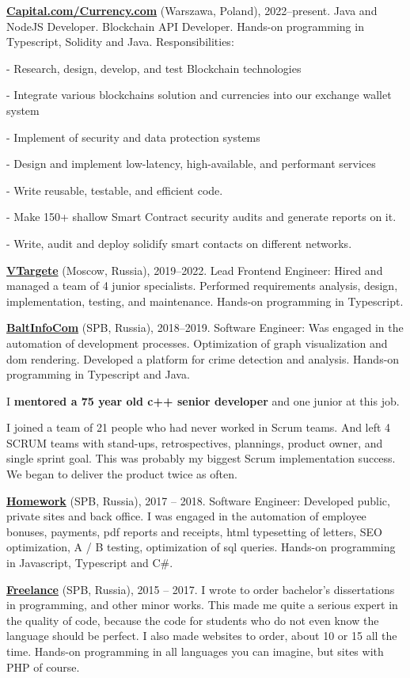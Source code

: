 \documentclass{yb}
\begin{document}
\href{https://currency.com/}{\textbf{Capital.com/Currency.com}} (Warszawa, Poland), 2022--present.
Java and NodeJS Developer. Blockchain API Developer.
Hands-on programming in Typescript, Solidity and Java.
Responsibilities:

- Research, design, develop, and test Blockchain technologies

- Integrate various blockchains solution and currencies into our exchange wallet system

- Implement of security and data protection systems

- Design and implement low-latency, high-available, and performant services

- Write reusable, testable, and efficient code.

- Make 150+ shallow Smart Contract security audits and generate reports on it.

- Write, audit and deploy solidify smart contacts on different networks.


\href{https://vtargete.ru/}{\textbf{VTargete}} (Moscow, Russia), 2019--2022.
Lead Frontend Engineer: 
Hired and managed a team of 4 junior specialists.
Performed requirements analysis, design, implementation, testing, and maintenance.
Hands-on programming in Typescript.

\textbf{\href{https://baltinfocom.ru/BigData\#en}{BaltInfoCom}} (SPB, Russia), 2018--2019.
Software Engineer:
Was engaged in the automation of development processes. Optimization of graph visualization and dom rendering. Developed a platform for crime detection and analysis.
Hands-on programming in Typescript and Java.

I \textbf{mentored a 75 year old c++ senior developer} and one junior at this job.

I joined a team of 21 people who had never worked in Scrum teams. And left 4 SCRUM teams with stand-ups, retrospectives, plannings, product owner, and single sprint goal. This was probably my biggest Scrum implementation success. We began to deliver the product twice as often.

\textbf{\href{https://homework.ru}{Homework}} (SPB, Russia), 2017 -- 2018.
Software Engineer:
Developed public, private sites and back office. I was engaged in the automation of employee bonuses, payments, pdf reports and receipts, html typesetting of letters, SEO optimization, A / B testing, optimization of sql queries.
Hands-on programming in Javascript, Typescript and C\#.

\textbf{\href{https://www.upwork.com/}{Freelance}} (SPB, Russia), 2015 -- 2017.
I wrote to order bachelor's dissertations in programming, and other minor works. This made me quite a serious expert in the quality of code, because the code for students who do not even know the language should be perfect. I also made websites to order, about 10 or 15 all the time. 
Hands-on programming in all languages you can imagine, but sites with PHP of course.
\end{document}
